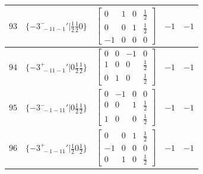 \documentclass[fleqn,8pt]{jsarticle}
\begin{document}
\begin{longtable}{ccccc}
$ 93 $ & $ \{-3^{-}_{\,\,-11-1}{}'|\frac{1}{2} \frac{1}{2} 0\} $ & $ \begin{bmatrix} 0 & 1 & 0 & \frac{1}{2} \\ 0 & 0 & 1 & \frac{1}{2} \\ -1 & 0 & 0 & 0 \end{bmatrix} $ & $ -1 $ & $ -1 $ \\ \hline
$ 94 $ & $ \{-3^{+}_{\,\,-11-1}{}'|0 \frac{1}{2} \frac{1}{2}\} $ & $ \begin{bmatrix} 0 & 0 & -1 & 0 \\ 1 & 0 & 0 & \frac{1}{2} \\ 0 & 1 & 0 & \frac{1}{2} \end{bmatrix} $ & $ -1 $ & $ -1 $ \\ \hline
$ 95 $ & $ \{-3^{-}_{\,\,-1-11}{}'|0 \frac{1}{2} \frac{1}{2}\} $ & $ \begin{bmatrix} 0 & -1 & 0 & 0 \\ 0 & 0 & 1 & \frac{1}{2} \\ 1 & 0 & 0 & \frac{1}{2} \end{bmatrix} $ & $ -1 $ & $ -1 $ \\ \hline
$ 96 $ & $ \{-3^{+}_{\,\,-1-11}{}'|\frac{1}{2} 0 \frac{1}{2}\} $ & $ \begin{bmatrix} 0 & 0 & 1 & \frac{1}{2} \\ -1 & 0 & 0 & 0 \\ 0 & 1 & 0 & \frac{1}{2} \end{bmatrix} $ & $ -1 $ & $ -1 $ \\
\end{longtable}
\end{document}
